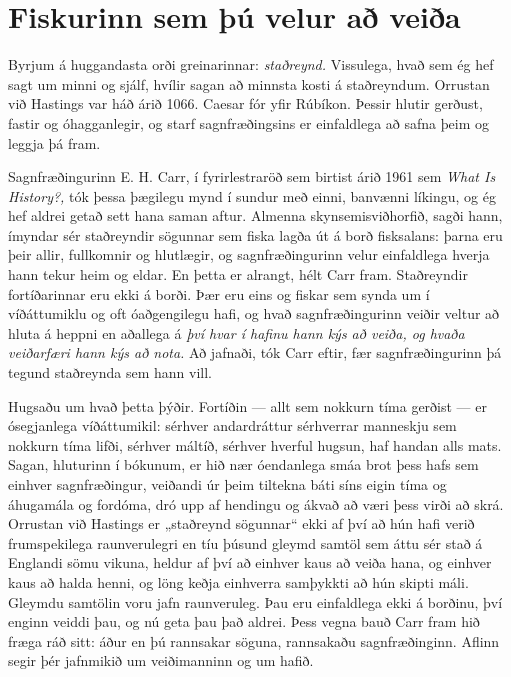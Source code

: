 \section*{Fiskurinn sem þú velur að veiða}

Byrjum á huggandasta orði greinarinnar: \emph{staðreynd.} Vissulega, hvað sem ég hef sagt um minni og sjálf, hvílir sagan að minnsta kosti á staðreyndum. Orrustan við Hastings var háð árið 1066. Caesar fór yfir Rúbíkon. Þessir hlutir gerðust, fastir og óhagganlegir, og starf sagnfræðingsins er einfaldlega að safna þeim og leggja þá fram.

Sagnfræðingurinn E. H. Carr, í fyrirlestraröð sem birtist árið 1961 sem \emph{What Is History?,} tók þessa þægilegu mynd í sundur með einni, banvænni líkingu, og ég hef aldrei getað sett hana saman aftur. Almenna skynsemisviðhorfið, sagði hann, ímyndar sér staðreyndir sögunnar sem fiska lagða út á borð fisksalans: þarna eru þeir allir, fullkomnir og hlutlægir, og sagnfræðingurinn velur einfaldlega hverja hann tekur heim og eldar. En þetta er alrangt, hélt Carr fram. Staðreyndir fortíðarinnar eru ekki á borði. Þær eru eins og fiskar sem synda um í víðáttumiklu og oft óaðgengilegu hafi, og hvað sagnfræðingurinn veiðir veltur að hluta á heppni en aðallega á \emph{því hvar í hafinu hann kýs að veiða, og hvaða veiðarfæri hann kýs að nota.} Að jafnaði, tók Carr eftir, fær sagnfræðingurinn þá tegund staðreynda sem hann vill.

Hugsaðu um hvað þetta þýðir. Fortíðin — allt sem nokkurn tíma gerðist — er ósegjanlega víðáttumikil: sérhver andardráttur sérhverrar manneskju sem nokkurn tíma lifði, sérhver máltíð, sérhver hverful hugsun, haf handan alls mats. Sagan, hluturinn í bókunum, er hið nær óendanlega smáa brot þess hafs sem einhver sagnfræðingur, veiðandi úr þeim tiltekna báti síns eigin tíma og áhugamála og fordóma, dró upp af hendingu og ákvað að væri þess virði að skrá. Orrustan við Hastings er „staðreynd sögunnar“ ekki af því að hún hafi verið frumspekilega raunverulegri en tíu þúsund gleymd samtöl sem áttu sér stað á Englandi sömu vikuna, heldur af því að einhver kaus að veiða hana, og einhver kaus að halda henni, og löng keðja einhverra samþykkti að hún skipti máli. Gleymdu samtölin voru jafn raunveruleg. Þau eru einfaldlega ekki á borðinu, því enginn veiddi þau, og nú geta þau það aldrei. Þess vegna bauð Carr fram hið fræga ráð sitt: áður en þú rannsakar söguna, rannsakaðu sagnfræðinginn. Aflinn segir þér jafnmikið um veiðimanninn og um hafið.


